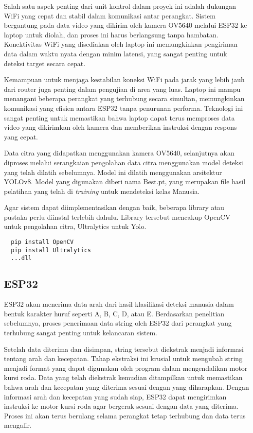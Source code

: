 Salah satu aspek penting dari unit kontrol dalam proyek ini adalah dukungan WiFi yang cepat dan stabil dalam komunikasi antar perangkat. Sistem bergantung pada data video yang dikirim oleh kamera OV5640 melalui ESP32 ke laptop untuk diolah, dan proses ini harus berlangsung tanpa hambatan. Konektivitas WiFi yang disediakan oleh laptop ini memungkinkan pengiriman data dalam waktu nyata dengan minim latensi, yang sangat penting untuk deteksi target secara cepat.

Kemampuan untuk menjaga kestabilan koneksi WiFi pada jarak yang lebih jauh dari router juga penting dalam pengujian di area yang luas. Laptop ini mampu menangani beberapa perangkat yang terhubung secara simultan, memungkinkan komunikasi yang efisien antara ESP32 tanpa penurunan performa. Teknologi ini sangat penting untuk memastikan bahwa laptop dapat terus memproses data video yang dikirimkan oleh kamera dan memberikan instruksi dengan respons yang cepat.

Data citra yang didapatkan menggunakan kamera OV5640, selanjutnya akan diproses melalui serangkaian pengolahan data citra menggunakan model deteksi yang telah dilatih sebelumnya. Model ini dilatih menggunakan arsitektur YOLOv8. Model yang digunakan diberi nama Best.pt, yang merupakan file hasil pelatihan yang telah di \emph{training} untuk mendeteksi kelas Manusia.

Agar sistem dapat diimplementasikan dengan baik, beberapa library atau pustaka perlu diinstal terlebih dahulu. Library tersebut mencakup OpenCV untuk pengolahan citra, Ultralytics untuk Yolo.

\begin{lstlisting}
  pip install OpenCV
  pip install Ultralytics
  ...dll
\end{lstlisting}

\subsection{ESP32}
\label{subsec:ESP32}
ESP32 akan menerima data arah dari hasil klasifikasi deteksi manusia dalam bentuk karakter huruf seperti A, B, C, D, atau E. Berdasarkan penelitian sebelumnya, proses penerimaan data string oleh ESP32 dari perangkat yang terhubung sangat penting untuk kelancaran sistem.

Setelah data diterima dan disimpan, string tersebut diekstrak menjadi informasi tentang arah dan kecepatan. Tahap ekstraksi ini krusial untuk mengubah string menjadi format yang dapat digunakan oleh program dalam mengendalikan motor kursi roda. Data yang telah diekstrak kemudian ditampilkan untuk memastikan bahwa arah dan kecepatan yang diterima sesuai dengan yang diharapkan. Dengan informasi arah dan kecepatan yang sudah siap, ESP32 dapat mengirimkan instruksi ke motor kursi roda agar bergerak sesuai dengan data yang diterima. Proses ini akan terus berulang selama perangkat tetap terhubung dan data terus mengalir.

